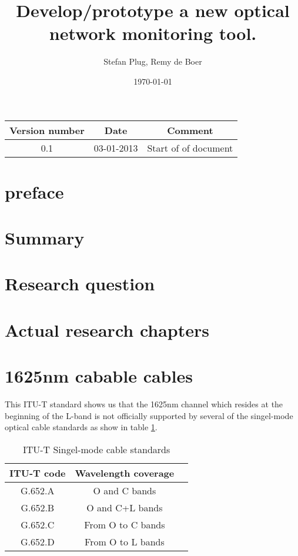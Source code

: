 \documentclass{article}
\begin{document}
\title{Develop/prototype a new optical network monitoring tool. }
\author{Stefan Plug, Remy de Boer}
\date{\today}
\maketitle

\begin{tabular}{|c|c|c|}
\hline 
Version number & Date & Comment \\ 
\hline 
0.1 & 03-01-2013 & Start of of document \\ 
\hline 
\end{tabular} 

\tableofcontents

\section{preface}

\section{Summary}

\section{Research question}

\section{Actual research chapters}

\section{1625nm cabable cables}
This ITU-T standard shows us that the 1625nm channel which resides at the beginning of the L-band is not officially supported by several of the singel-mode optical cable standards as show in table \ref{tab:singel-mode_types}.

\begin{table}[h]
\centering
\label{tab:singel-mode_types}
\caption{ITU-T Singel-mode cable standards}
\begin{tabular}{|c|c|c|}
\hline 
ITU-T code & Wavelength coverage\\ 
\hline 
G.652.A & O and C bands \\ 
\hline
G.652.B & O and C+L bands \\
\hline
G.652.C & From O to C bands \\
\hline
G.652.D & From O to L bands \\
\hline
\end{tabular} 
\end{table}
\end{document}
